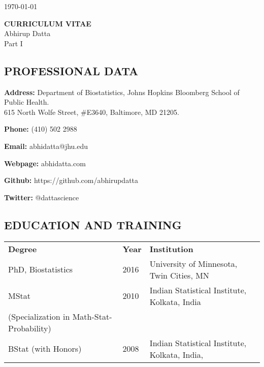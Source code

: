 \documentclass[12pt]{article}
\newcommand{\mydot}[1]{\begin{enumerate}[label=$\circ$,leftmargin=\parindent]\setlength{\itemsep}{#1}}
\begin{document}
\hfill \today

\begin{center}
{\bf CURRICULUM VITAE}\\
Abhirup Datta\\[3mm]
Part I
\end{center}

\vspace*{10mm}

\subsection*{PROFESSIONAL DATA}

\textbf{Address:} Department of Biostatistics, Johns Hopkins Bloomberg School of Public Health.\\[0.2em]
615 North Wolfe Street, \#E3640, Baltimore, MD 21205.

\textbf{Phone:} (410) 502 2988  

\textbf{Email:} abhidatta@jhu.edu 

\textbf{Webpage:} abhidatta.com 

\textbf{Github:} https://github.com/abhirupdatta

\textbf{Twitter:} @dattascience


\subsection*{EDUCATION AND TRAINING}

\smallskip



\begin{tabular}{lll}
\textbf{Degree} & \textbf{Year} & \textbf{Institution}\\
PhD, Biostatistics & 2016 & University of Minnesota, Twin Cities, MN\\
MStat & 2010 & Indian Statistical Institute, Kolkata, India\\
(Specialization in Math-Stat-Probability) & &  \\
BStat (with Honors) & 2008 & Indian Statistical Institute, Kolkata, India,
\end{tabular}
\end{document}
